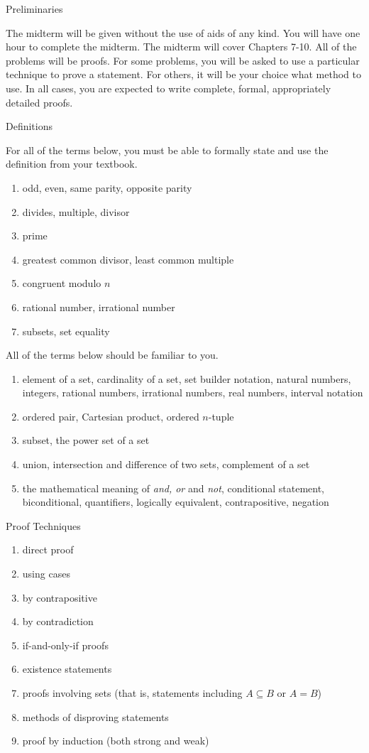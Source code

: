 \documentclass[12pt]{article}
\newcommand{\be}{\begin{enumerate}}
\newcommand{\ee}{\end{enumerate}}
\begin{document}
\thispagestyle{fancy}

\begin{center} Preliminaries \end{center}

The midterm will be given without the use of aids of any kind. You will have one hour to complete the midterm. The midterm will cover Chapters 7-10. All of the problems will be proofs.  For some problems, you will be asked to use a particular technique to prove a statement. For others, it will be your choice what method to use. In all cases, you are expected to write complete, formal, appropriately detailed proofs.\\

\begin{center} Definitions \end{center}

For all of the terms below, you must be able to formally state and use the definition from your textbook. 
\be
\item odd, even, same parity, opposite parity
\item divides, multiple, divisor
\item prime
\item greatest common divisor, least common multiple
\item congruent modulo $n$
\item rational number, irrational number
\item subsets, set equality
\ee

All of the terms below should be familiar to you.
\be
\item element of a set, {cardinality of a set}, set builder notation, {natural numbers, integers, rational numbers, irrational numbers, real numbers}, interval notation
\item ordered pair, {Cartesian product, ordered $n$-tuple}
\item {subset, the power set of a set}
\item {union, intersection and difference of two sets, complement of a set}
\item the mathematical meaning of \emph{and, or} and \emph{not}, conditional statement, biconditional, quantifiers, logically equivalent, contrapositive, negation
\ee

\begin{center} Proof Techniques \end{center}
\be
\item direct proof
\item using cases
\item by contrapositive
\item by contradiction
\item if-and-only-if proofs
\item existence statements
\item proofs involving sets (that is, statements including $A \subseteq B$ or $A=B$)
\item methods of disproving statements
\item proof by induction (both strong and weak)
\ee
\end{document}

